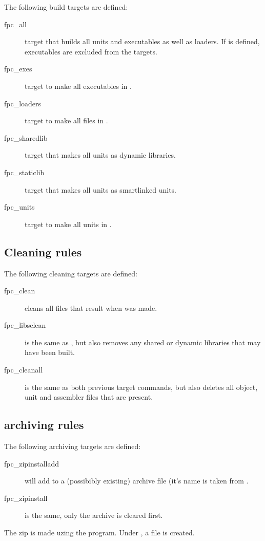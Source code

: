 \documentclass{report}
\begin{document}
The following build targets are defined:
\begin{description}
\item[fpc\_all] target that builds all units and executables as well as
loaders. If  is defined, executables are excluded from the
targets.
\item[fpc\_exes] target to make all executables in .
\item[fpc\_loaders] target to make all files in .
\item[fpc\_sharedlib] target that makes all units as dynamic libraries.
\item[fpc\_staticlib] target that makes all units as smartlinked units.
\item[fpc\_units] target to make all units in .
\end{description}

\subsection{Cleaning rules}

The following cleaning targets are defined:
\begin{description}
\item[fpc\_clean] cleans all files that result when  was made.
\item[fpc\_libsclean] is the same as , but also removes any
shared or dynamic libraries that may have been built.
\item[fpc\_cleanall] is the same as both previous target commands, but also
deletes all object, unit and assembler files that are present.
\end{description}

\subsection{archiving rules}

The following archiving targets are defined:
\begin{description}
\item[fpc\_zipinstalladd] will add to a (possibibly existing) archive file (it's
name is taken from .
\item[fpc\_zipinstall] is the same, only the archive is cleared first.
\end{description}
The zip is made uzing the  program. Under \linux, a
 file is created.
\end{document}

